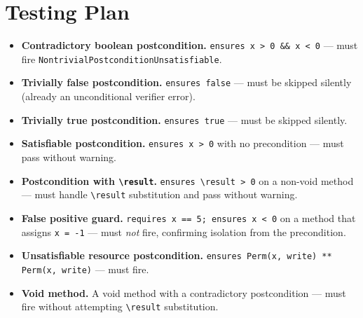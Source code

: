 \documentclass[9pt,a4paper,twocolumn]{article}
\begin{document}
\section{Testing Plan}

\begin{itemize}
  \item \textbf{Contradictory boolean postcondition.}
    \texttt{ensures x > 0 \&\& x < 0} — must fire
    \texttt{NontrivialPostconditionUnsatisfiable}.

  \item \textbf{Trivially false postcondition.}
    \texttt{ensures false} — must be skipped silently
    (already an unconditional verifier error).

  \item \textbf{Trivially true postcondition.}
    \texttt{ensures true} — must be skipped silently.

  \item \textbf{Satisfiable postcondition.}
    \texttt{ensures x > 0} with no precondition — must
    pass without warning.

  \item \textbf{Postcondition with \texttt{\textbackslash result}.}
    \texttt{ensures \textbackslash result > 0} on a
    non-void method — must handle \texttt{\textbackslash result}
    substitution and pass without warning.

  \item \textbf{False positive guard.}
    \texttt{requires x == 5; ensures x < 0} on a method
    that assigns \texttt{x = -1} — must \emph{not} fire,
    confirming isolation from the precondition.

  \item \textbf{Unsatisfiable resource postcondition.}
    \texttt{ensures Perm(x, write) ** Perm(x, write)} —
    must fire.

  \item \textbf{Void method.}
    A void method with a contradictory postcondition —
    must fire without attempting \texttt{\textbackslash result}
    substitution.
\end{itemize}
\end{document}
